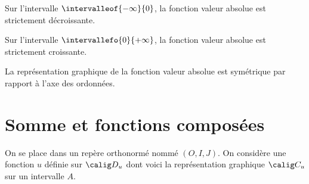 \documentclass[xcolor={dvipsnames,svgnames,table}]{beamer}
\begin{document}
\begin{frame}
\begin{Prop}
    Sur l'intervalle $\intervalleof{-\infty}{0}$, la fonction valeur absolue est strictement décroissante.\par
    Sur l'intervalle $\intervallefo{0}{+\infty}$, la fonction valeur absolue est strictement croissante.
\end{Prop}

\begin{center}
\end{center}
\end{frame}

\begin{frame}
    \begin{Prop}
        La représentation graphique de la fonction valeur absolue est symétrique par rapport à l'axe des ordonnées.
    \end{Prop}
\end{frame}

\section{Somme et fonctions composées}

\begin{frame}
On se place dans un repère orthonormé nommé $(O, I, J)$. On considère une fonction $u$ définie sur $\calig D_u$ dont voici la représentation graphique $\calig C_u$ sur un intervalle $A$.

\begin{center}
\end{center}

\end{frame}
\end{document}
